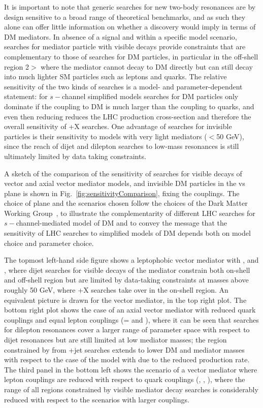 It is important to note that generic searches for new two-body resonances
are by design sensitive to a broad range of theoretical benchmarks, 
and as such they alone can offer little information on 
whether a discovery would imply in terms of DM mediators.
In absence of a signal and within a specific model scenario,
searches for mediator particle with visible decays
provide constraints that are complementary to those of searches
for DM particles, in particular in the off-shell region 2\mdm $>$ \mmed where the mediator
cannot decay to DM directly but can still decay into much lighter SM particles
such as leptons and quarks. 
The relative sensitivity of the two kinds of searches
is a model- and parameter-dependent statement: for $s-$channel simplified models
searches for DM particles only dominate if the coupling to DM is much larger
than the coupling to quarks, and even then reducing \gq reduces the LHC production
cross-section and therefore the overall sensitivity of \MET+X searches. 
One advantage of searches for invisible particles is their sensitivity to models with
very light mediators ($<$50 GeV), since the reach of dijet and dilepton searches to low-mass
resonances is still ultimately limited by data taking constraints. 

A sketch of the comparison of the sensitivity of searches for visible decays of vector and axial vector mediator models, and invisible DM particles 
in the \mdm vs \mmed plane is shown in Fig.~\ref{fig:sensitivityComparison}, fixing the couplings. The choice of plane and the scenarios chosen follow the choices of the Dark Matter Working Group~\cite{Albert:2017onk}, to illustrate the complementarity of different LHC searches for $s-$channel-mediated model of DM and to convey the message that the sensitivity of LHC searches to simplified models of DM depends both on model choice and parameter choice. 

The topmost left-hand side figure shows a leptophobic vector mediator with ,  and , where dijet searches for visible decays of the mediator constrain both on-shell and off-shell region but are limited by data-taking constraints at masses above roughly 50 GeV, where \MET+X searches take over in the on-shell region. An equivalent picture is drawn for the vector mediator, in the top right plot. The bottom right plot shows the case of an axial vector mediator with reduced quark couplings and equal lepton couplings (\gq= and ), where it can be seen that searches for dilepton resonances cover a larger range of parameter space with respect to dijet resonances but are still limited at low mediator masses; the region constrained by from \MET+jet searches extends to lower DM and mediator masses with respect to the case of the model with  due to the reduced production rate. The third panel in the bottom left shows the scenario of a vector mediator where lepton couplings are reduced with respect to quark couplings (, , ), where the range of all regions constrained by visible mediator decay searches is considerably reduced with respect to the scenarios with larger couplings. 

